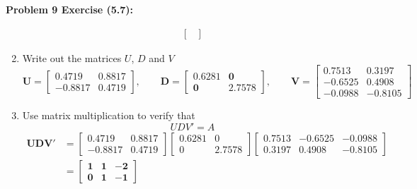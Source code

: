\documentclass[11pt]{article}
\newenvironment{problem}[1]{\textbf{Problem #1: }}{\newpage}
\begin{document}
\begin{problem}{9 Exercise (5.7)}
\begin{enumerate}[label = (\alph*)]
\begin{align*}
{\begin{bmatrix}
				\end{bmatrix}}
			\end{align*}
			\item Write out the matrices $U$, $D$ and $V$
			\[\boldsymbol{U = \begin{bmatrix}
				0.4719 & 0.8817 \\
				-0.8817 & 0.4719
			\end{bmatrix}, \qquad D = \begin{bmatrix}
				0.6281 & 0 \\ 0 & 2.7578
			\end{bmatrix}, \qquad V = \begin{bmatrix}
				 0.7513 &  0.3197 \\
				-0.6525 &  0.4908 \\
				-0.0988 & -0.8105
			\end{bmatrix}}\]
			\item Use matrix multiplication to verify that
			\[UDV' = A\]
			\begin{align*} 
			\boldsymbol{UDV'} &= \begin{bmatrix}
				0.4719 & 0.8817 \\
				-0.8817 & 0.4719
			\end{bmatrix}\begin{bmatrix}
				0.6281   &      0 \\
				0  &  2.7578
			\end{bmatrix}\begin{bmatrix}
    			0.7513 &  -0.6525 &  -0.0988 \\
				0.3197 &   0.4908 &  -0.8105
			\end{bmatrix}
			\\ 
			& = \boldsymbol{\begin{bmatrix}
				1 & 1 & -2 \\ 0 & 1 & -1
			\end{bmatrix}} 
			\end{align*}
		\end{enumerate}
	\end{problem}
\end{document}
